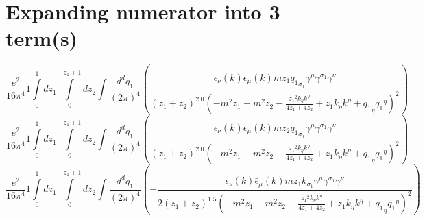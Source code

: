\section*{Expanding numerator into 3 term(s)}
\begin{dmath}\frac{e^{2}}{16 \pi^{4}}1\int\limits_{ 0 }^{ 1 } d{ z_{ 1 } }\int\limits_{ 0 }^{ - { z_{ 1 } } + 1 } d{ z_{ 2 } }\int\frac{d^d q_1 }{ (2\pi)^4 }\left(\frac{\epsilon_{ \nu }({ k }) \bar{\epsilon}_{ \mu }({ k }) m { z_{ 1 } } { { q_1 }_{ \sigma_1 } } { \gamma^{ \mu } } { \gamma^{ \sigma_1 } } { \gamma^{ \nu } }}{\left({ z_{ 1 } } + { z_{ 2 } }\right)^{2.0} \left(- m^{2} { z_{ 1 } } - m^{2} { z_{ 2 } } - \frac{{ z_{ 1 } }^{2} { { k }_{ \eta } } { { k }^{ \eta } }}{4 { z_{ 1 } } + 4 { z_{ 2 } }} + { z_{ 1 } } { { k }_{ \eta } } { { k }^{ \eta } } + { { q_1 }_{ \eta } } { { q_1 }^{ \eta } }\right)^{2}}\right)\end{dmath}
\begin{dmath}\frac{e^{2}}{16 \pi^{4}}1\int\limits_{ 0 }^{ 1 } d{ z_{ 1 } }\int\limits_{ 0 }^{ - { z_{ 1 } } + 1 } d{ z_{ 2 } }\int\frac{d^d q_1 }{ (2\pi)^4 }\left(\frac{\epsilon_{ \nu }({ k }) \bar{\epsilon}_{ \mu }({ k }) m { z_{ 2 } } { { q_1 }_{ \sigma_1 } } { \gamma^{ \mu } } { \gamma^{ \sigma_1 } } { \gamma^{ \nu } }}{\left({ z_{ 1 } } + { z_{ 2 } }\right)^{2.0} \left(- m^{2} { z_{ 1 } } - m^{2} { z_{ 2 } } - \frac{{ z_{ 1 } }^{2} { { k }_{ \eta } } { { k }^{ \eta } }}{4 { z_{ 1 } } + 4 { z_{ 2 } }} + { z_{ 1 } } { { k }_{ \eta } } { { k }^{ \eta } } + { { q_1 }_{ \eta } } { { q_1 }^{ \eta } }\right)^{2}}\right)\end{dmath}
\begin{dmath}\frac{e^{2}}{16 \pi^{4}}1\int\limits_{ 0 }^{ 1 } d{ z_{ 1 } }\int\limits_{ 0 }^{ - { z_{ 1 } } + 1 } d{ z_{ 2 } }\int\frac{d^d q_1 }{ (2\pi)^4 }\left(- \frac{\epsilon_{ \nu }({ k }) \bar{\epsilon}_{ \mu }({ k }) m { z_{ 1 } } { { k }_{ \sigma_1 } } { \gamma^{ \mu } } { \gamma^{ \sigma_1 } } { \gamma^{ \nu } }}{2 \left({ z_{ 1 } } + { z_{ 2 } }\right)^{1.5} \left(- m^{2} { z_{ 1 } } - m^{2} { z_{ 2 } } - \frac{{ z_{ 1 } }^{2} { { k }_{ \eta } } { { k }^{ \eta } }}{4 { z_{ 1 } } + 4 { z_{ 2 } }} + { z_{ 1 } } { { k }_{ \eta } } { { k }^{ \eta } } + { { q_1 }_{ \eta } } { { q_1 }^{ \eta } }\right)^{2}}\right)\end{dmath}
